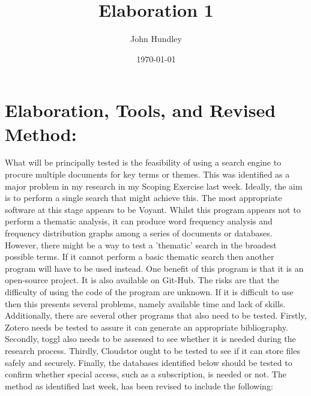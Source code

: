 \documentclass[a4paper,12pt]{article}
\title{Elaboration 1}
\author{John Hundley}
\date{\today}
\begin{document}
\maketitle

\section{Elaboration, Tools, and Revised Method:}

What will be principally tested is the feasibility of using a search engine to procure multiple documents for key terms or themes. This was identified as a major problem in my research in my Scoping Exercise last week. Ideally, the aim is to perform a single search that might achieve this. The most appropriate software at this stage appears to be Voyant. Whilst this program appears not to perform a thematic analysis, it can produce word frequency analysis and frequency distribution graphs among a series of documents or databases. However, there might be a way to test a 'thematic' search in the broadest possible terms. If it cannot perform a basic thematic search then another program will have to be used instead. One benefit of this program is that it is an open-source project. It is also available on Git-Hub. The risks are that the difficulty of using the code of the program are unknown. If it is difficult to use then this presents several problems, namely available time and lack of skills. Additionally, there are several other programs that also need to be tested. Firstly, Zotero needs be tested to assure it can generate an appropriate bibliography. Secondly, toggl also needs to be assessed to see whether it is needed during the research process. Thirdly, Cloudstor ought to be tested to see if it can store files safely and securely. Finally, the databases identified below should be tested to confirm whether special access, such as a subscription, is needed or not. The method as identified last week, has been revised to include the following: 
\end{document}
